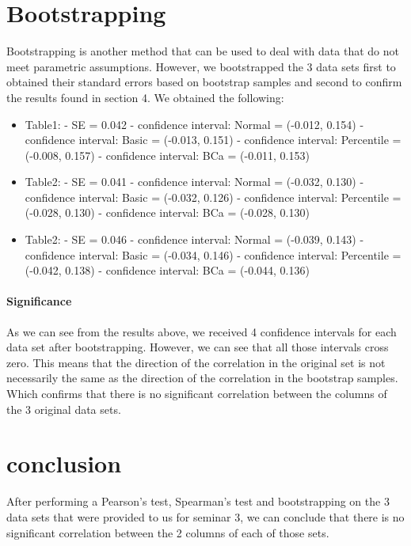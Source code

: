 \documentclass[12pt]{article}
\begin{document}
	\section{Bootstrapping}
		Bootstrapping is another method that can be used to deal with data that do not meet parametric assumptions. However, we bootstrapped the 3 data sets first to obtained their standard errors based on bootstrap samples and second to confirm the results found in section 4. We obtained the following:
			\begin{itemize}
				\item Table1: 
				\subitem - SE = 0.042
				\subitem - confidence interval: Normal = (-0.012, 0.154) 
				\subitem - confidence interval: Basic = (-0.013, 0.151)
				\subitem - confidence interval: Percentile = (-0.008, 0.157)
				\subitem - confidence interval: BCa = (-0.011, 0.153)
				\item Table2:
				\subitem - SE = 0.041 
				\subitem - confidence interval: Normal = (-0.032, 0.130)
				\subitem - confidence interval: Basic = (-0.032, 0.126)
				\subitem - confidence interval: Percentile = (-0.028, 0.130)
				\subitem - confidence interval: BCa = (-0.028, 0.130)
				\item Table2:
				\subitem - SE = 0.046
				\subitem - confidence interval: Normal = (-0.039, 0.143)
				\subitem - confidence interval: Basic = (-0.034, 0.146)
				\subitem - confidence interval: Percentile = (-0.042, 0.138)
				\subitem - confidence interval: BCa = (-0.044, 0.136)
			\end{itemize}
		\paragraph{Significance}
		As we can see from the results above, we received 4 confidence intervals for each data set after bootstrapping. However, we can see that all those intervals cross zero. This means that the direction of the correlation in the original set is not necessarily the same as the direction of the correlation in the bootstrap samples. Which confirms that there is no significant correlation between the columns of the 3 original data sets.
	
	\section{conclusion}
		After performing a Pearson's test, Spearman's test and bootstrapping on the 3 data sets that were provided to us for seminar 3, we can conclude that there is no significant correlation between the 2 columns of each of those sets.
	
\end{document}
